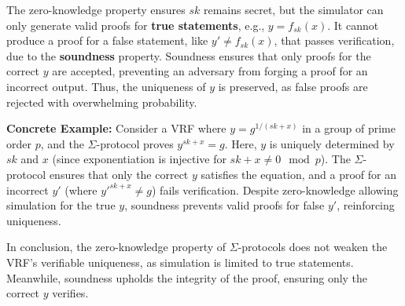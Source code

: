 The zero-knowledge property ensures $sk$ remains secret, but the simulator can only generate valid proofs for \textbf{true statements}, e.g., $y = f_{sk}(x)$. It cannot produce a proof for a false statement, like $y' \neq f_{sk}(x)$, that passes verification, due to the \textbf{soundness} property. Soundness ensures that only proofs for the correct $y$ are accepted, preventing an adversary from forging a proof for an incorrect output. Thus, the uniqueness of $y$ is preserved, as false proofs are rejected with overwhelming probability.

\textbf{Concrete Example:} Consider a VRF where $y = g^{1/(sk + x)}$ in a group of prime order $p$, and the $\Sigma$-protocol proves $y^{sk + x} = g$. Here, $y$ is uniquely determined by $sk$ and $x$ (since exponentiation is injective for $sk + x \neq 0 \mod p$). The $\Sigma$-protocol ensures that only the correct $y$ satisfies the equation, and a proof for an incorrect $y'$ (where $y'^{sk + x} \neq g$) fails verification. Despite zero-knowledge allowing simulation for the true $y$, soundness prevents valid proofs for false $y'$, reinforcing uniqueness.

In conclusion, the zero-knowledge property of $\Sigma$-protocols does not weaken the VRF's verifiable uniqueness, as simulation is limited to true statements. Meanwhile, soundness upholds the integrity of the proof, ensuring only the correct $y$ verifies.